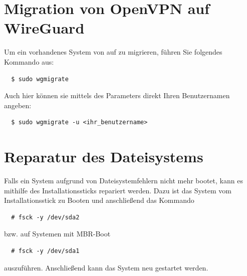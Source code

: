 \documentclass[a4paper,11pt,authoryear]{article}
\begin{document}
\section{Migration von OpenVPN auf WireGuard}
Um ein vorhandenes System von  auf  zu migrieren, führen Sie folgendes Kommando aus:
\begin{verbatim}
  $ sudo wgmigrate
\end{verbatim}
Auch hier können sie mittels des Parameters  direkt Ihren Benutzernamen angeben:
\begin{verbatim}
  $ sudo wgmigrate -u <ihr_benutzername>
\end{verbatim}

\section{Reparatur des Dateisystems}
Falls ein System aufgrund von Dateisystemfehlern nicht mehr bootet, kann es mithilfe des Installationssticks repariert werden.
Dazu ist das System vom Installationsstick zu Booten und anschließend das Kommando
\begin{verbatim}
  # fsck -y /dev/sda2
\end{verbatim}
bzw. auf Systemen mit MBR-Boot
\begin{verbatim}
  # fsck -y /dev/sda1
\end{verbatim}
auszuführen.
Anschließend kann das System neu gestartet werden.

{}

\end{document}
